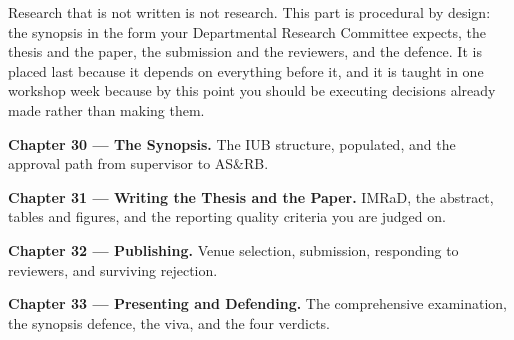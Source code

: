 
Research that is not written is not research. This part is procedural
by design: the synopsis in the form your Departmental Research Committee
expects, the thesis and the paper, the submission and the reviewers, and the
defence. It is placed last because it depends on everything before it, and it
is taught in one workshop week because by this point you should be executing
decisions already made rather than making them.

\begin{conceptbox}
\begin{tight}
  \item \textbf{Chapter 30 --- The Synopsis.} The IUB structure, populated, and the approval path from supervisor to AS\&RB.
  \item \textbf{Chapter 31 --- Writing the Thesis and the Paper.} IMRaD, the abstract, tables and figures, and the reporting quality criteria you are judged on.
  \item \textbf{Chapter 32 --- Publishing.} Venue selection, submission, responding to reviewers, and surviving rejection.
  \item \textbf{Chapter 33 --- Presenting and Defending.} The comprehensive examination, the synopsis defence, the viva, and the four verdicts.
\end{tight}
\end{conceptbox}
